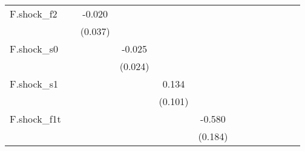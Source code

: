 {\begin{tabular}{l*{12}{c}}
\addlinespace
F.shock\_f2  &                     &      -0.020         &                     &                     &                     &                     &                     &                     &                     &                     &                     &                     \\
            &                     &     (0.037)         &                     &                     &                     &                     &                     &                     &                     &                     &                     &                     \\
\addlinespace
F.shock\_s0  &                     &                     &      -0.025         &                     &                     &                     &                     &                     &                     &                     &                     &                     \\
            &                     &                     &     (0.024)         &                     &                     &                     &                     &                     &                     &                     &                     &                     \\
\addlinespace
F.shock\_s1  &                     &                     &                     &       0.134         &                     &                     &                     &                     &                     &                     &                     &                     \\
            &                     &                     &                     &     (0.101)         &                     &                     &                     &                     &                     &                     &                     &                     \\
\addlinespace
F.shock\_f1t &                     &                     &                     &                     &      -0.580\sym{***}&                     &                     &                     &                     &                     &                     &                     \\
            &                     &                     &                     &                     &     (0.184)         &                     &                     &                     &                     &                     &                     &                     \\

\end{tabular}}
